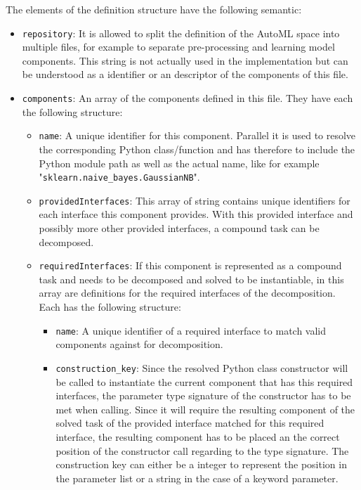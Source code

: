 The elements of the definition structure have the following semantic:
\begin{itemize}
	\item \texttt{repository}: It is allowed to split the definition of the AutoML space into multiple files, for example to separate pre-processing and learning model components. This string is not actually used in the implementation but can be understood as a identifier or an descriptor of the components of this file.
	\item \texttt{components}: An array of the components defined in this file. They have each the following structure:
		\begin{itemize}[label=\textbullet]
			\item \texttt{name}: A unique identifier for this component. Parallel it is used to resolve the corresponding Python class/function and has therefore to include the Python module path as well as the actual name, like for example "\texttt{sklearn.naive\_bayes.GaussianNB}".
			\item \texttt{providedInterfaces}: This array of string contains unique identifiers for each interface this component provides. With this provided interface and possibly more other provided interfaces, a compound task can be decomposed. 
            \item \texttt{requiredInterfaces}: If this component is represented as a compound task and needs to be decomposed and solved to be instantiable, in this array are definitions for the required interfaces of the decomposition. Each has the following structure:
            \begin{itemize}[label=\textbullet]
                \item \texttt{name}: A unique identifier of a required interface to match valid components against for decomposition.
                \item \texttt{construction\_key}: Since the resolved Python class constructor will be called to instantiate the current component that has this required interfaces, the parameter type signature of the constructor has to be met when calling.
                    Since it will require the resulting component of the solved task of the provided interface matched for this required interface, the resulting component has to be placed an the correct position of the constructor call regarding to the type signature.
                    The construction key can either be a integer to represent the position in the parameter list or a string in the case of a keyword parameter. 

\end{itemize}
\end{itemize}
\end{itemize}
